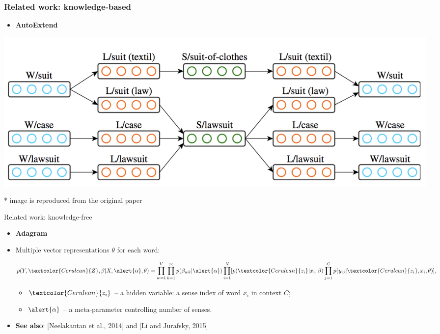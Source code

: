 \begin{frame}
\frametitle{Related work: knowledge-based}
\begin{itemize}
	\item \textbf{AutoExtend}~\cite{rothe-schutze:2015:ACL-IJCNLP}
\end{itemize}
\begin{center}
 \includegraphics[width=1.0\textwidth]{autoextend}
 \end{center}

{\footnotesize
 * image is reproduced from the original paper
}

\end{frame}

\begin{frame}{Related work: knowledge-free}

\begin{itemize}
\item \textbf{Adagram}~\cite{bartunov2016breaking}
\item Multiple vector representations $\theta$ for each word:

\pause
 $$p(Y,\textcolor{Cerulean}{Z},\mathbf{\beta}|X,\alert{\alpha},\theta) = \prod_{w=1}^{V} \prod_{k=1}^{\infty} p(\beta_{wk}|\alert{\alpha}) \prod_{i=1}^N [p(\textcolor{Cerulean}{z_i}|x_i,\mathbf{\beta}) \prod_{j=1}^C p(y_{ij}|\textcolor{Cerulean}{z_i},x_i,\theta)],$$ 
\begin{itemize}
 
\item $\textcolor{Cerulean}{z_i}$ -- a hidden variable: a sense index of word $x_i$ in context $C$; 
\item $\alert{\alpha}$ -- a meta-parameter controlling number of senses.
\end{itemize}

\pause 
\item \alert{\textbf{See also}}: [Neelakantan et al., 2014] and [Li and Jurafsky, 2015]

\end{itemize}
	
\end{frame}


